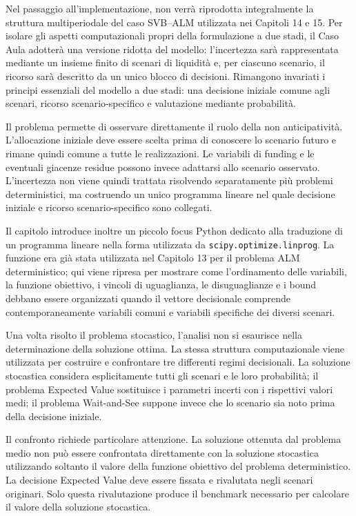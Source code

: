 Nel passaggio all'implementazione, non verr\`{a} riprodotta integralmente
la struttura multiperiodale del caso SVB--ALM utilizzata nei Capitoli 14
e 15. Per isolare gli aspetti computazionali propri della formulazione
a due stadi, il Caso Aula adotter\`{a} una versione ridotta del modello:
l'incertezza sar\`{a} rappresentata mediante un insieme finito di scenari
di liquidit\`{a} e, per ciascuno scenario, il ricorso sar\`{a} descritto
da un unico blocco di decisioni. Rimangono invariati i principi essenziali
del modello a due stadi: una decisione iniziale comune agli scenari,
ricorso scenario-specifico e valutazione mediante probabilit\`{a}.

Il problema permette di osservare direttamente il ruolo della
non anticipativit\`a. L'allocazione iniziale deve essere scelta prima di
conoscere lo scenario futuro e rimane quindi comune a tutte le realizzazioni.
Le variabili di funding e le eventuali giacenze residue possono invece
adattarsi allo scenario osservato. L'incertezza non viene quindi trattata
risolvendo separatamente pi\`u problemi deterministici, ma costruendo un unico
programma lineare nel quale decisione iniziale e ricorso scenario-specifico
sono collegati.

Il capitolo introduce inoltre un piccolo focus Python dedicato alla
traduzione di un programma lineare nella forma utilizzata da
\texttt{scipy.optimize.linprog}. La funzione era gi\`a stata utilizzata nel
Capitolo 13 per il problema ALM deterministico; qui viene ripresa per mostrare
come l'ordinamento delle variabili, la funzione obiettivo, i vincoli di
uguaglianza, le disuguaglianze e i bound debbano essere organizzati quando il
vettore decisionale comprende contemporaneamente variabili comuni e variabili
specifiche dei diversi scenari.

Una volta risolto il problema stocastico, l'analisi non si esaurisce nella
determinazione della soluzione ottima. La stessa struttura computazionale
viene utilizzata per costruire e confrontare tre differenti regimi
decisionali. La soluzione stocastica considera esplicitamente tutti gli
scenari e le loro probabilit\`a; il problema Expected Value sostituisce i
parametri incerti con i rispettivi valori medi; il problema Wait-and-See
suppone invece che lo scenario sia noto prima della decisione iniziale.

Il confronto richiede particolare attenzione. La soluzione ottenuta dal
problema medio non pu\`o essere confrontata direttamente con la soluzione
stocastica utilizzando soltanto il valore della funzione obiettivo del
problema deterministico. La decisione Expected Value deve essere fissata e
rivalutata negli scenari originari. Solo questa rivalutazione produce il
benchmark necessario per calcolare il valore della soluzione stocastica.

